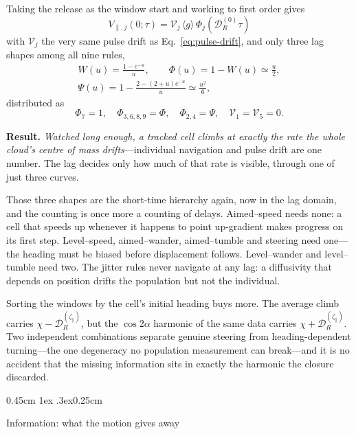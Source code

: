 \documentclass[
  reprint,
  superscriptaddress,
  amsmath,
  amssymb,
  aps,
  pre,
  nofootinbib,
  floatfix
]{revtex4-2}
\makeatletter
\newcommand{\DR}{\mathcal D_R^{(0)}}
\newcommand{\zp}{\zeta_\parallel}
\def\subsection{\@startsection{subsection}{2}{\z@}%
  {0.45cm \@plus1ex \@minus.3ex}{0.25cm}%
  {\normalfont\small\bfseries\raggedright}}%
\makeatother
\begin{document}
Taking the release as the window start and working to first order gives
\begin{equation}
 \boxed{\;V_{\parallel,j}(0;\tau)=\mathcal V_j\,\langle g\rangle\,
 \Phi_j\!\left(\DR\tau\right)\;}
 \label{eq:projected-velocity-result}
\end{equation}
with $\mathcal V_j$ the very same pulse drift as Eq.~\eqref{eq:pulse-drift},
and only three lag shapes among all nine rules,
\begin{equation}
\begin{gathered}
 W(u)=\frac{1-e^{-u}}{u},\qquad
 \Phi(u)=1-W(u)\simeq\frac u2,\\
 \Psi(u)=1-\frac{2-(2+u)e^{-u}}{u}\simeq\frac{u^{2}}{6},
\end{gathered}
 \label{eq:lag-shapes}
\end{equation}
distributed as
\begin{equation}
 \Phi_7=1,\quad
 \Phi_{3,6,8,9}=\Phi,\quad
 \Phi_{2,4}=\Psi,\quad
 \mathcal V_1=\mathcal V_5=0 .
 \label{eq:lag-hierarchy}
\end{equation}

\textbf{Result.}  \emph{Watched long enough, a tracked cell climbs at exactly
the rate the whole cloud's centre of mass drifts}---individual navigation and
pulse drift are one number.  The lag decides only how much of that rate is
visible, through one of just three curves.

Those three shapes are the short-time hierarchy again, now in the lag domain,
and the counting is once more a counting of delays.  Aimed--speed needs none:
a cell that speeds up whenever it happens to point up-gradient makes progress
on its first step.  Level--speed, aimed--wander, aimed--tumble and steering
need one---the heading must be biased before displacement follows.
Level--wander and level--tumble need two.  The jitter rules never navigate at
any lag: a diffusivity that depends on position drifts the population but not
the individual.

Sorting the windows by the cell's initial heading buys more.  The average
climb carries $\chi-\mathcal D_R^{(\zp)}$, but the $\cos2\alpha$ harmonic of
the same data carries $\chi+\mathcal D_R^{(\zp)}$.  Two independent
combinations separate genuine steering from heading-dependent turning---the
one degeneracy no population measurement can break---and it is no accident
that the missing information sits in exactly the harmonic the closure
discarded.

\subsection{Information: what the motion gives away}
\end{document}

